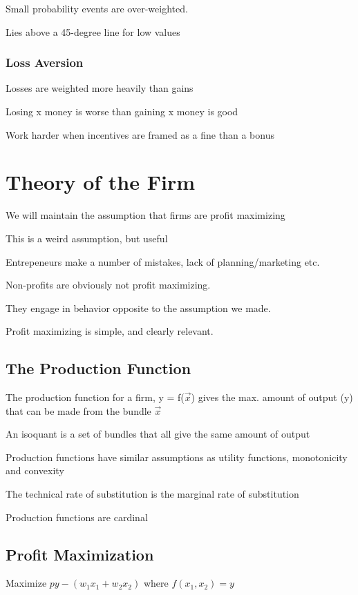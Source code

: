 \documentclass[12pt]{article}
\begin{document}
Small probability events are over-weighted.

Lies above a 45-degree line for low values

\subsubsection{Loss Aversion}

Losses are weighted more heavily than gains

Losing x money is worse than gaining x money is good

Work harder when incentives are framed as a fine than a bonus

\newpage
\section{Theory of the Firm}

We will maintain the assumption that firms are profit maximizing

This is a weird assumption, but useful

Entrepeneurs make a number of mistakes, lack of planning/marketing etc.

Non-profits are obviously not profit maximizing.

They engage in behavior opposite to the assumption we made.

Profit maximizing is simple, and clearly relevant.

\subsection{The Production Function}

The production function for a firm, y = f($\vec{x}$) gives the max. amount of output (y) that can be made from the bundle $\vec{x}$

An isoquant is a set of bundles that all give the same amount of output

Production functions have similar assumptions as utility functions, monotonicity and convexity

The technical rate of substitution is the marginal rate of substitution

Production functions are cardinal

\subsection{Profit Maximization}

Maximize $py - (w_{1}x_{1} + w_{2}x_{2})$ where $f(x_{1},x_{2}) = y$
\end{document}
